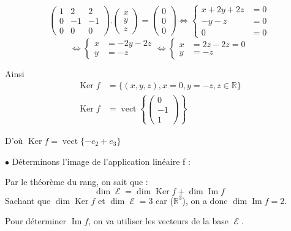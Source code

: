\documentclass[a4paper,12pt]{article}
\DeclareMathOperator{\Ker}{Ker}
\DeclareMathOperator{\Img}{Im}
\DeclareMathOperator{\vect}{vect}
\DeclareMathOperator{\E}{\mathcal{E}}
\DeclareMathOperator{\di}{dim}
\begin{document}
$$
\begin{pmatrix}
    1&2&2\\
    0&-1&-1\\
    0&0&0
\end{pmatrix}
.
\begin{pmatrix}x\\ y\\ z\end{pmatrix}
=\begin{pmatrix}0\\ 0\\ 0\end{pmatrix}
\Leftrightarrow
\left\{\begin{array}{rl}
    x+2y+2z&=0\\
    -y-z&=0\\
    0&=0\end{array}\right.
$$
$$
\Leftrightarrow
\left\{\begin{array}{rl}
    x&=-2y-2z\\
y&=-z\end{array}\right.
%
\Leftrightarrow
%
\left\{\begin{array}{rl}
    x&=2z-2z=0\\
y&=-z\end{array}\right.
$$

Ainsi
\begin{align*}
    \Ker f&=\{(x,y,z),x=0,y=-z,z\in\mathbb{R}\}\\
    \Ker f&=\vect{\left\{\begin{pmatrix}0\\-1\\1\end{pmatrix}\right\}}
\end{align*}

D'où $\Ker f=\vect\{-e_2+e_3\}$

$\bullet$ Déterminons l'image de l'application linéaire f :

Par le théorème du rang, on sait que :
$$\di\E=\di\Ker f+\di\Img f$$
Sachant que $\di\Ker f$ et $\di\E =3$ car ($\mathbb{R}^3$), on a donc $\di\Img f =2$.

Pour déterminer $\Img f$, on va utiliser les vecteurs de la base $\E$.
\end{document}
